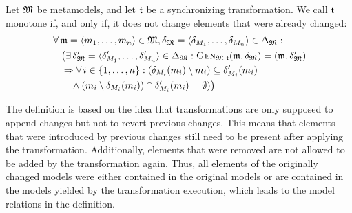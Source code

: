 \begin{definition}
    \label{def:monotonetransformation}
    Let $\metamodeltuple{M}$ be metamodels, and let $\transformation{t}$ be a synchronizing transformation. We call $\transformation{t}$ monotone if, and only if, it does not change elements that were already changed:
    \begin{align*}
        &
        \forall \modeltuple{m} = \tupled{\model{m}{1}, \dots, \model{m}{n}} \in \metamodeltuple{M}, \changetuple{\metamodeltuple{M}} = \tupled{\change{\metamodel{M}{1}}, \dots, \change{\metamodel{M}{n}}} \in \changeuniverse{\metamodeltuple{M}} : \\
        & \formulaskip
        \bigl(
        \exists \changetuple{\metamodeltuple{M}}' = \tupled{\change{\metamodel{M}{1}}', \dots, \change{\metamodel{M}{n}}'} \in \changeuniverse{\metamodeltuple{M}} : \generalizationfunction{\metamodeltuple{M},\transformation{t}}(\modeltuple{m}, \changetuple{\metamodeltuple{M}}) = (\modeltuple{m},\changetuple{\metamodeltuple{M}}') \\
        & \formulaskip
        \Rightarrow
        \forall i \in \setted{1, \dots, n} : 
        (\change{\metamodel{M}{i}}(\model{m}{i}) \setminus \model{m}{i}) \subseteq \change{\metamodel{M}{i}}'(\model{m}{i})
        \\
        & \formulaskip\formulaskip
        \land
        (\model{m}{i} \setminus \change{\metamodel{M}{i}}(\model{m}{i})) \cap \change{\metamodel{M}{i}}'(\model{m}{i})
         = \emptyset)
        \bigr)
    \end{align*}
\end{definition}

The definition is based on the idea that transformations are only supposed to append changes but not to revert previous changes.
This means that elements that were introduced by previous changes still need to be present after applying the transformation.
Additionally, elements that were removed are not allowed to be added by the transformation again.
Thus, all elements of the originally changed models were either contained in the original models or are contained in the models yielded by the transformation execution, which leads to the model relations in the definition.


